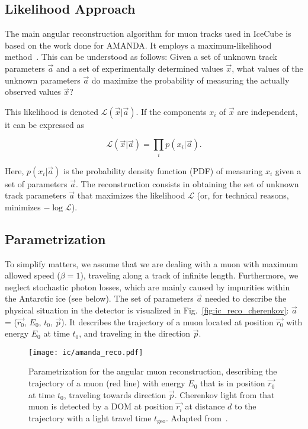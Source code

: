 \subsection{Likelihood Approach}
The main angular reconstruction algorithm for muon tracks used in IceCube is based on the work done for AMANDA. It employs a maximum-likelihood method~. This can be understood as follows: Given a set of unknown track parameters $\vec{a}$ and a set of experimentally determined values $\vec{x}$, what values of the unknown parameters $\vec{a}$ do maximize the probability of measuring the actually observed values $\vec{x}$?

This likelihood is denoted $\mathcal{L}(\vec{x}|\vec{a})$. If the components $x_i$ of $\vec{x}$ are independent, it can be expressed as

\begin{equation}
    \mathcal{L}(\vec{x}|\vec{a}) = \prod_i p(x_i|\vec{a}).
\end{equation}

Here, $p(x_i|\vec{a})$ is the probability density function (PDF) of measuring $x_i$ given a set of parameters $\vec{a}$. The reconstruction consists in obtaining the set of unknown track parameters $\vec{a}$ that maximizes the likelihood $\mathcal{L}$ (or, for technical reasons, minimizes $-\log{\mathcal{L}}$).

\subsection{Parametrization}

To simplify matters, we assume that we are dealing with a muon with maximum allowed speed ($\beta=1$), traveling along a track of infinite length. Furthermore, we neglect stochastic photon losses, which are mainly caused by impurities within the Antarctic ice (see below). The set of parameters $\vec{a}$ needed to describe the physical situation in the detector is visualized in Fig.~\ref{fig:ic_reco_cherenkov}: $\vec{a}$ = ($\vec{r_0}$, $E_0$, $t_0$, $\vec{p}$). It describes the trajectory of a muon located at position $\vec{r_0}$ with energy $E_0$ at time $t_0$, and traveling in the direction $\vec{p}$.

\begin{figure}[htb]
    \texttt{[image: ic/amanda\_reco.pdf]}
    \caption[Angular reconstruction in IceCube]{Parametrization for the angular muon reconstruction, describing the trajectory of a muon (red line) with energy $E_0$ that is in position $\vec{r_0}$ at time $t_0$, traveling towards direction $\vec{p}$. Cherenkov light from that muon is detected by a DOM at position $\vec{r_i}$ at distance $d$ to the trajectory with a light travel time $t_\text{geo}$. Adapted from~\cite{Ahrens2004}.}
\end{figure}

